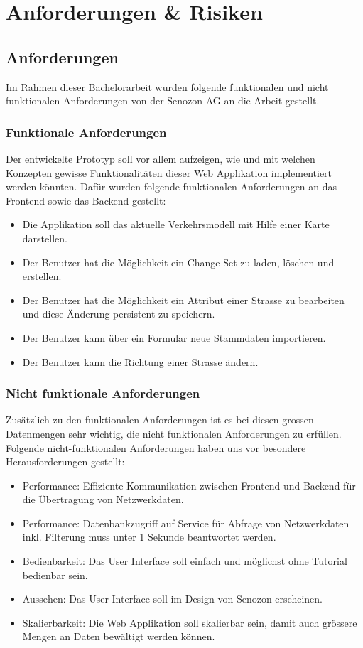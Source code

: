 \chapter{Anforderungen \& Risiken} \label{ch:anforderungen_section}
\section{Anforderungen}
Im Rahmen dieser Bachelorarbeit wurden folgende funktionalen und nicht funktionalen Anforderungen von der Senozon AG an die Arbeit gestellt.
\subsection{Funktionale Anforderungen}
Der entwickelte Prototyp soll vor allem aufzeigen, wie und mit welchen Konzepten gewisse Funktionalitäten dieser Web Applikation implementiert werden könnten. Dafür wurden folgende funktionalen Anforderungen an das Frontend sowie das Backend gestellt:
\begin{itemize}
\item Die Applikation soll das aktuelle Verkehrsmodell mit Hilfe einer Karte darstellen.
\item Der Benutzer hat die Möglichkeit ein Change Set zu laden, löschen und erstellen.
\item Der Benutzer hat die Möglichkeit ein Attribut einer Strasse zu bearbeiten und diese Änderung persistent zu speichern.
\item Der Benutzer kann über ein Formular neue Stammdaten importieren.
\item Der Benutzer kann die Richtung einer Strasse ändern.
\end{itemize}
\subsection{Nicht funktionale Anforderungen}
\label{ch:NFRs}
Zusätzlich zu den funktionalen Anforderungen ist es bei diesen grossen Datenmengen sehr wichtig, die nicht funktionalen Anforderungen zu erfüllen. Folgende nicht-funktionalen Anforderungen haben uns vor besondere Herausforderungen gestellt:
\begin{itemize}
\item Performance: Effiziente Kommunikation zwischen Frontend und Backend für die Übertragung von Netzwerkdaten.
\item Performance: Datenbankzugriff auf Service für Abfrage von Netzwerkdaten inkl. Filterung muss unter 1 Sekunde beantwortet werden.
\item Bedienbarkeit: Das User Interface soll einfach und möglichst ohne Tutorial bedienbar sein.
\item Aussehen: Das User Interface soll im Design von Senozon erscheinen.
\item Skalierbarkeit: Die Web Applikation soll skalierbar sein, damit auch grössere Mengen an Daten bewältigt werden können.
\end{itemize}
